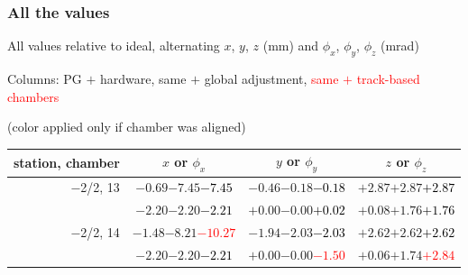 \documentclass[compress]{beamer}
\begin{document}
\begin{frame}
\frametitle{All the values}
\tiny

All values relative to ideal, alternating $x$, $y$, $z$ (mm) and $\phi_x$, $\phi_y$, $\phi_z$ (mrad)

Columns: PG $+$ hardware, same $+$ global adjustment, \textcolor{red}{same $+$ track-based chambers}

\hfill (color applied only if chamber was aligned)

\vfill
\renewcommand{\arraystretch}{1.1}
\begin{tabular}{r | c | c | c}
station, chamber & $x$ or $\phi_x$ & $y$ or $\phi_y$ & $z$ or $\phi_z$ \\\hline
$-$2/2, 13 & $-0.69$\hspace{0.1 cm}$-7.45$\hspace{0.1 cm}\textcolor{black}{$-7.45$} & $-0.46$\hspace{0.1 cm}$-0.18$\hspace{0.1 cm}\textcolor{black}{$-0.18$} & $+2.87$\hspace{0.1 cm}$+2.87$\hspace{0.1 cm}\textcolor{black}{$+2.87$} \\
           & $-2.20$\hspace{0.1 cm}$-2.20$\hspace{0.1 cm}\textcolor{black}{$-2.21$} & $+0.00$\hspace{0.1 cm}$-0.00$\hspace{0.1 cm}\textcolor{black}{$+0.02$} & $+0.08$\hspace{0.1 cm}$+1.76$\hspace{0.1 cm}\textcolor{black}{$+1.76$} \\
$-$2/2, 14 & $-1.48$\hspace{0.1 cm}$-8.21$\hspace{0.1 cm}\textcolor{red}{$-10.27$} & $-1.94$\hspace{0.1 cm}$-2.03$\hspace{0.1 cm}\textcolor{black}{$-2.03$} & $+2.62$\hspace{0.1 cm}$+2.62$\hspace{0.1 cm}\textcolor{black}{$+2.62$} \\
           & $-2.20$\hspace{0.1 cm}$-2.20$\hspace{0.1 cm}\textcolor{black}{$-2.21$} & $+0.00$\hspace{0.1 cm}$-0.00$\hspace{0.1 cm}\textcolor{red}{$-1.50$} & $+0.06$\hspace{0.1 cm}$+1.74$\hspace{0.1 cm}\textcolor{red}{$+2.84$} \\

\end{tabular}
\end{frame}
\end{document}
